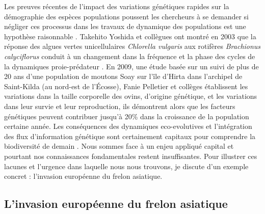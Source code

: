 Les preuves récentes de l'impact des variations génétiques rapides sur
la démographie des espèces populations poussent les chercheurs à se
demander si négliger ces processus dans les travaux de dynamique des
populations est une hypothèse raisonnable \citep[\citet{Post2009},
\citet{Schoener2011}]{Pelletier2009}. Takehito Yoshida et collègues ont
montré en 2003 que la réponse des algues vertes unicellulaires
\emph{Chlorella vulgaris} aux rotifères \emph{Brachionus calyciflorus}
conduit à un changement dans la fréquence et la phase des cycles de la
dynamiques proie-prédateur \citep{Yoshida2003}. En 2009, une étude basée
sur un suivi de plus de 20 ans d'une population de moutons Soay sur
l'île d'Hirta dans l'archipel de Saint-Kilda (au nord-est de l'Écosse),
Fanie Pelletier et collèges établissent les variations dans la taille
corporelle des ovins, d'origine génétique, et les variations dans leur
survie et leur reproduction, ils démontrent alors que les facteurs
génétiques peuvent contribuer jusqu'à 20\% dans la croissance de la
population certaine année. Les conséquences des dynamiques
eco-evolutives et l'intégration des flux d'information génétique sont
certainement capitaux pour comprendre la biodiversité de demain
\citep[\citet{Lavergne2010}]{Sexton2009}. Nous sommes face à un enjeu
appliqué capital et pourtant nos connaissances fondamentales restent
insuffisantes. Pour illustrer ces lacunes et l'urgence dans laquelle
nous nous trouvons, je discute d'un exemple concret : l'invasion
européenne du frelon asiatique.

\subsection*{L'invasion européenne du frelon
asiatique}\label{linvasion-europuxe9enne-du-frelon-asiatique}


